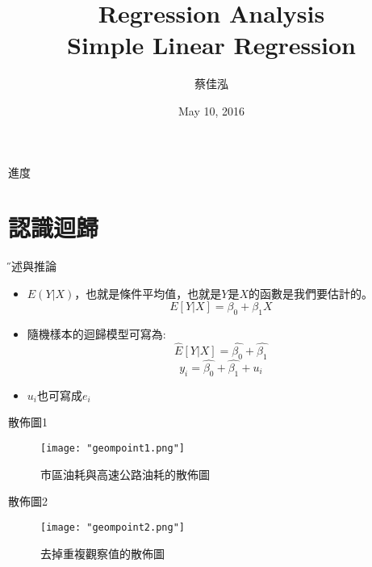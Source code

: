 \documentclass[xcolor=dvipsnames]{beamer}
\author[蔡佳泓]{\K 蔡佳泓}
\title[Statistical Methods for Social Sciences]{Regression Analysis\\
\smallskip
{\small {Simple Linear Regression}}}
\date{May 10, 2016} %
\institute[ESC \& GIEAS]{\H 國立政治大學選舉研究中心暨東亞研究所}
\begin{document}
\maketitle
\begin{frame}{進度}
\tableofcontents
\end{frame}


\section{認識迴歸}
\begin{frame}{\H 描述與推論}
\begin{itemize}
\item $ E(Y|X) $，也就是條件平均值，也就是$Y$是$X$的函數是我們要估計的。
\[E[Y|X]=\beta_{0}+\beta_{1}X\]
\item 隨機樣本的迴歸模型可寫為:
\[\hat{E}[Y|X]=\hat{\beta_{0}}+\hat{\beta_{1}}\]
\[y_{i}=\hat{\beta_{0}}+\hat{\beta_{1}}+u_{i}\]
\item $u_{i}$也可寫成$e_{i}$
\end{itemize}
\end{frame}
\begin{frame}{散佈圖1}
\begin{figure}
\texttt{[image: "geompoint1.png"]}
\caption{市區油耗與高速公路油耗的散佈圖}
\label{fig.1}
\end{figure}
\end{frame}
\begin{frame}{散佈圖2}
\begin{figure}
\texttt{[image: "geompoint2.png"]}
\caption{去掉重複觀察值的散佈圖}
\label{fig.2}
\end{figure}
\end{frame}
\end{document}
